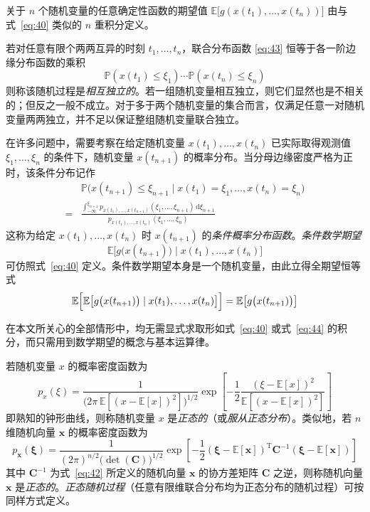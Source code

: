 关于 $n$ 个随机变量的任意确定性函数的期望值 $\mathbb{E}\bigl[g(x(t_1), \dots, x(t_n))\bigr]$ 由与式~\eqref{eq:40} 类似的 $n$ 重积分定义。

若对任意有限个两两互异的时刻 $t_1, \dots, t_n$，联合分布函数 \eqref{eq:43} 恒等于各一阶边缘分布函数的乘积
\begin{equation*}
\mathbb{P}(x(t_1) \leq \xi_1) \cdots \mathbb{P}(x(t_n) \leq \xi_n)
\end{equation*}
则称该随机过程是\emph{相互独立的}。若一组随机变量相互独立，则它们显然也是不相关的；但反之一般不成立。对于多于两个随机变量的集合而言，仅满足任意一对随机变量两两独立，并不足以保证整组随机变量联合独立。

在许多问题中，需要考察在给定随机变量 $x(t_1), \dots, x(t_n)$ 已实际取得观测值 $\xi_1, \dots, \xi_n$ 的条件下，随机变量 $x(t_{n+1})$ 的概率分布。当分母边缘密度严格为正时，该条件分布记作
\begin{equation}\label{eq:44}
\begin{aligned}
&\mathbb{P}\bigl(x(t_{n+1}) \leq \xi_{n+1} \mid x(t_1) = \xi_1, \dots, x(t_n) = \xi_n\bigr) \\
= &\frac{\displaystyle\int_{-\infty}^{\xi_{n+1}} p_{x(t_1),\dots,x(t_{n+1})}(\xi_1, \dots, \xi_{n+1})\,\mathrm{d}\xi_{n+1}}{p_{x(t_1),\dots,x(t_n)}(\xi_1, \dots, \xi_n)}
\end{aligned}
\end{equation}
这称为给定 $x(t_1), \dots, x(t_n)$ 时 $x(t_{n+1})$ 的\emph{条件概率分布函数}。\emph{条件数学期望}
\begin{equation*}
\mathbb{E}\bigl[g\bigl(x(t_{n+1})\bigr) \mid x(t_1), \dots, x(t_n)\bigr]
\end{equation*}
可仿照式~\eqref{eq:40} 定义。条件数学期望本身是一个随机变量，由此立得全期望恒等式
\begin{equation*}
\mathbb{E}\Bigl[\mathbb{E}\bigl[g\bigl(x(t_{n+1})\bigr) \mid x(t_1), \dots, x(t_n)\bigr]\Bigr] = \mathbb{E}\bigl[g\bigl(x(t_{n+1})\bigr)\bigr]
\end{equation*}

在本文所关心的全部情形中，均无需显式求取形如式~\eqref{eq:40} 或式~\eqref{eq:44} 的积分，而只需用到数学期望的概念与基本运算律。

若随机变量 $x$ 的概率密度函数为
\begin{equation*}
p_x(\xi) = \frac{1}{\bigl(2\pi\,\mathbb{E}[(x - \mathbb{E}[x])^2]\bigr)^{1/2}} \exp\left[-\frac{1}{2}\frac{(\xi - \mathbb{E}[x])^2}{\mathbb{E}[(x - \mathbb{E}[x])^2]}\right]
\end{equation*}
即熟知的钟形曲线，则称随机变量 $x$ 是\emph{正态的}（或\emph{服从正态分布}）。类似地，若 $n$ 维随机向量 $\bm{x}$ 的概率密度函数为
\begin{equation*}
p_{\bm{x}}(\bm{\xi}) = \frac{1}{(2\pi)^{n/2}\bigl(\det(\bm{C})\bigr)^{1/2}} \exp\left[-\frac{1}{2}(\bm{\xi} - \mathbb{E}[\bm{x}])^{\mathrm{T}}\bm{C}^{-1}(\bm{\xi} - \mathbb{E}[\bm{x}])\right]
\end{equation*}
其中 $\bm{C}^{-1}$ 为式~\eqref{eq:42} 所定义的随机向量 $\bm{x}$ 的协方差矩阵 $\bm{C}$ 之逆，则称随机向量 $\bm{x}$ 是\emph{正态的}。\emph{正态随机过程}（任意有限维联合分布均为正态分布的随机过程）可按同样方式定义。

